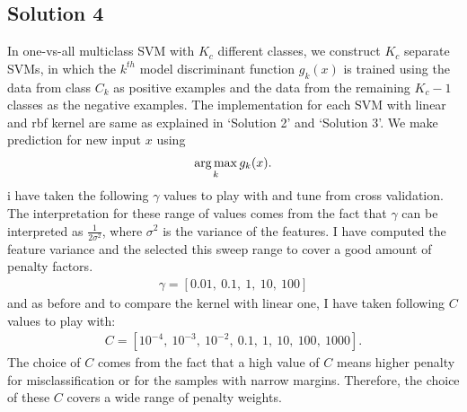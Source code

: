 \subsection*{Solution 4}
In one-vs-all multiclass SVM with $K_c$ different classes, we construct $K_c$ separate SVMs, in which the $k^{th}$ model discriminant function $g_k(x)$ is trained using the data from class $C_k$ as positive examples and the data from the remaining $K_c-1$ classes as the negative examples. The implementation for each SVM with linear and rbf kernel are same as explained in `Solution 2' and `Solution 3'. We make prediction for new input $x$ using
\begin{align*}
	\operatorname*{arg\,max}_k g_k(x).
\end{align*}
i have taken the following $\gamma$ values to play with and tune from cross validation. The interpretation for these range of values comes from the fact that $\gamma$ can be interpreted as $\frac{1}{2\sigma^2}$, where $\sigma^2$ is the variance of the features. I have computed the feature variance and the selected this sweep range to cover a good amount of penalty factors.
\begin{align*}
	\gamma = [0.01,\ 0.1,\ 1,\ 10,\ 100]
\end{align*}
and as before and to compare the kernel with linear one, I have taken following $C$ values to play with:
\begin{align*}
	C = [10^{-4},\ 10^{-3},\ 10^{-2},\ 0.1,\ 1,\ 10,\ 100,\ 1000].
\end{align*}
The choice of $C$ comes from the fact that a high value of $C$ means higher penalty for misclassification or for the samples with narrow margins. Therefore, the choice of these $C$ covers a wide range of penalty weights.
